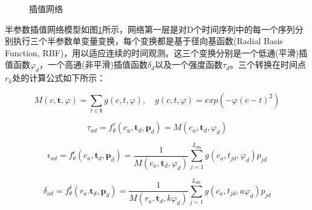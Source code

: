 \documentclass[a4paper,10pt]{my_paper}
\numberwithin{equation}{section}
\begin{document}
\begin{figure}[h!]
  \caption{插值网络}\label{fig_插值网络}
\end{figure}

半参数插值网络模型如图\ref{fig_插值网络}所示，网络第一层是对D个时间序列中的每一个序列分别执行三个半参数单变量变换，每个变换都是基于径向基函数(Radial Basis Function, RBF)，用以适应连续的时间观测。这三个变换分别是一个低通(平滑)插值函数${\varphi_d}$，一个高通(非平滑)插值函数${\delta_d}$以及一个强度函数${\tau_d}$。三个转换在时间点${r_k}$处的计算公式如下所示：

\begin{equation}
  M(c,\textbf{t},\varphi)=\sum_{t\in \textbf{t}}g(c,t,\varphi), \quad g(c,t,\varphi )=exp(-\varphi (c-t)^2) 
\end{equation}

\begin{equation}
  \tau_{ad} = f_\theta^\tau (c_a, \textbf{t}_d, \textbf{p}_d) = M(c_a, \textbf{t}_d,\varphi_d)
\end{equation}

\begin{equation}
  \epsilon_{ad} = f_\theta^\epsilon (c_a, \textbf{t}_d, \textbf{p}_d) = \frac{1}{M(c_a,\textbf{t}_d, \varphi _d)}\sum_{j = 1}^{L_{dn}}g(c_a, t_{jd},\varphi _d)p_{jd}  
\end{equation}

\begin{equation}
  \delta_{ad} = f_\theta^\delta(r_a.\textbf{t}_d,\textbf{p}_d)=\frac{1}{M(r_a,\textbf{t}_d,k\varphi_d)}\sum_{j = 1}^{L_{dn}}g(c_a,t_{jd},a\varphi_d)p_{jd}  
\end{equation}
\end{document}
